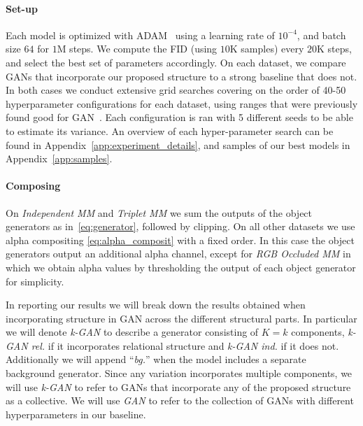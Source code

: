 \documentclass{article}
\begin{document}
\paragraph{Set-up}
Each model is optimized with ADAM~\citep{kingma2015adam} using a learning rate of $10^{-4}$, and batch size $64$ for $1$M steps. 
We compute the FID (using $10$K samples) every $20$K steps, and select the best set of parameters accordingly.
On each dataset, we compare GANs that incorporate our proposed structure to a strong baseline that does not.
In both cases we conduct extensive grid searches covering on the order of 40-50 hyperparameter configurations for each dataset, using ranges that were previously found good for GAN~\citep{lucic2017gans, kurach2018gan}.
Each configuration is ran with 5 different seeds to be able to estimate its variance.
An overview of each hyper-parameter search can be found in Appendix~\ref{app:experiment_details}, and samples of our best models in Appendix~\ref{app:samples}.

\paragraph{Composing} On \emph{Independent MM} and \emph{Triplet MM} we sum the outputs of the object generators as in~\eqref{eq:generator}, followed by clipping.
On all other datasets we use alpha compositing \eqref{eq:alpha_composit} with a fixed order.
In this case the object generators output an additional alpha channel, except for \emph{RGB Occluded MM} in which we obtain alpha values by thresholding the output of each object generator for simplicity.

In reporting our results we will break down the results obtained when incorporating structure in GAN across the different structural parts.
In particular we will denote \emph{k-GAN} to describe a generator consisting of $K=k$ components, \emph{k-GAN rel.} if it incorporates relational structure and \emph{k-GAN ind.} if it does not.
Additionally we will append ``\emph{bg.}'' when the model includes a separate background generator.
Since any variation incorporates multiple components, we will use \emph{k-GAN} to refer to GANs that incorporate any of the proposed structure as a collective.
We will use \emph{GAN} to refer to the collection of GANs with different hyperparameters in our baseline.
\end{document}

